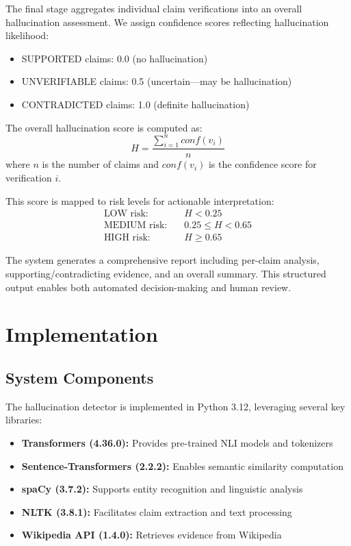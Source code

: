 \documentclass[conference]{IEEEtran}
\begin{document}
The final stage aggregates individual claim verifications into an overall hallucination assessment. We assign confidence scores reflecting hallucination likelihood:

\begin{itemize}
\item SUPPORTED claims: 0.0 (no hallucination)
\item UNVERIFIABLE claims: 0.5 (uncertain—may be hallucination)
\item CONTRADICTED claims: 1.0 (definite hallucination)
\end{itemize}

The overall hallucination score is computed as:
\begin{equation}
H = \frac{\sum_{i=1}^{n} conf(v_i)}{n}
\end{equation}
where $n$ is the number of claims and $conf(v_i)$ is the confidence score for verification $i$.

This score is mapped to risk levels for actionable interpretation:
\begin{align*}
\text{LOW risk:} & \quad H < 0.25 \\
\text{MEDIUM risk:} & \quad 0.25 \leq H < 0.65 \\
\text{HIGH risk:} & \quad H \geq 0.65
\end{align*}

The system generates a comprehensive report including per-claim analysis, supporting/contradicting evidence, and an overall summary. This structured output enables both automated decision-making and human review.

\section{Implementation}

\subsection{System Components}

The hallucination detector is implemented in Python 3.12, leveraging several key libraries:

\begin{itemize}
\item \textbf{Transformers (4.36.0):} Provides pre-trained NLI models and tokenizers
\item \textbf{Sentence-Transformers (2.2.2):} Enables semantic similarity computation
\item \textbf{spaCy (3.7.2):} Supports entity recognition and linguistic analysis
\item \textbf{NLTK (3.8.1):} Facilitates claim extraction and text processing
\item \textbf{Wikipedia API (1.4.0):} Retrieves evidence from Wikipedia
\end{itemize}
\end{document}
